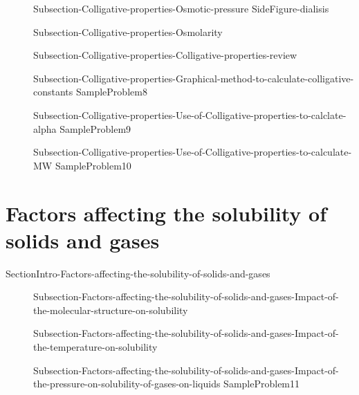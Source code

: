 \documentclass[main.tex]{subfiles}
\newcommand\chapterlabel{Ch-solutions}\setcounter{figurenewcounter}{0}\setcounter{tablenewcounter}{0}\setcounter{formulanewcounter}{0}
\begin{document}
\begin{description}
\item[] {Subsection-Colligative-properties-Osmotic-pressure}
{SideFigure-dialisis}
\item[] {Subsection-Colligative-properties-Osmolarity}
\item[] {Subsection-Colligative-properties-Colligative-properties-review}
\item[] {Subsection-Colligative-properties-Graphical-method-to-calculate-colligative-constants}
{SampleProblem8}
\item[] {Subsection-Colligative-properties-Use-of-Colligative-properties-to-calclate-alpha}
{SampleProblem9}
\item[] {Subsection-Colligative-properties-Use-of-Colligative-properties-to-calculate-MW}
{SampleProblem10}
\end{description}




\section{Factors affecting the solubility of solids and gases}{SectionIntro-Factors-affecting-the-solubility-of-solids-and-gases}
\sloppy \begin{description}
\item[] {Subsection-Factors-affecting-the-solubility-of-solids-and-gases-Impact-of-the-molecular-structure-on-solubility}
\item[] {Subsection-Factors-affecting-the-solubility-of-solids-and-gases-Impact-of-the-temperature-on-solubility}
\item[] {Subsection-Factors-affecting-the-solubility-of-solids-and-gases-Impact-of-the-pressure-on-solubility-of-gases-on-liquids}
{SampleProblem11}
\end{description}
\end{document}
